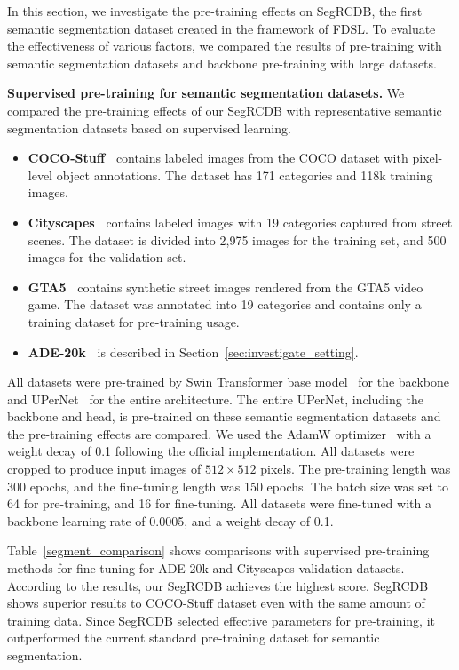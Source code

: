 \documentclass[10pt,twocolumn,letterpaper]{article}
\begin{document}
In this section, we investigate the pre-training effects on SegRCDB, the first semantic segmentation dataset created in the framework of FDSL. To evaluate the effectiveness of various factors, we compared the results of pre-training with semantic segmentation datasets and backbone pre-training with large datasets. 

\noindent \textbf{Supervised pre-training for semantic segmentation datasets.}
\label{sec:semseg_comparison}
We compared the pre-training effects of our SegRCDB with representative semantic segmentation datasets based on supervised learning.

\begin{itemize}
\item \textbf{COCO-Stuff~\cite{https://doi.org/10.48550/arxiv.1612.03716}} contains labeled images from the COCO dataset with pixel-level object annotations. The dataset has 171 categories and 118k training images.
\item \textbf{Cityscapes~\cite{Cordts2016Cityscapes}} contains labeled images with 19 categories captured from street scenes. The dataset is divided into 2,975 images for the training set, and 500 images for the validation set. 
\item \textbf{GTA5~\cite{Richter_2016_ECCV}} contains synthetic street images rendered from the GTA5 video game. The dataset was annotated into 19 categories and contains only a training dataset for pre-training usage.
\item \textbf{ADE-20k~\cite{zhou2017scene}} is described in Section~\ref{sec:investigate_setting}. 
\end{itemize}

All datasets were pre-trained by Swin Transformer base model~\cite{liu2021Swin} for the backbone and UPerNet~\cite{xiao2018unified} for the entire architecture.
The entire UPerNet, including the backbone and head, is pre-trained on these semantic segmentation datasets and the pre-training effects are compared.
We used the
AdamW optimizer~\cite{Loshchilov2019DecoupledWD} with a weight decay of 0.1 following the official implementation. All datasets were cropped to produce input images of $512 \times 512$ pixels.  The pre-training length was 300 epochs, and the fine-tuning length was 150 epochs. 
The batch size was set to 64 for pre-training, and 16 for fine-tuning.  All datasets were fine-tuned with a backbone learning rate of 0.0005, and a weight decay of 0.1. 

Table~\ref{segment_comparison} shows comparisons with supervised pre-training methods for fine-tuning for ADE-20k and Cityscapes validation datasets.
According to the results, our SegRCDB achieves the highest score.
SegRCDB shows superior results to COCO-Stuff dataset even with the same amount of training data. Since SegRCDB selected effective parameters for pre-training, it outperformed the current standard pre-training dataset for semantic segmentation.
\end{document}
